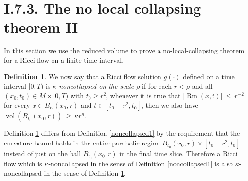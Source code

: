 \documentclass[12pt]{amsart}
\newcommand{\Rm}{\operatorname{Rm}}
\newcommand{\vol}{\operatorname{vol}}
\numberwithin{equation}{section}
\theoremstyle{plain}
\theoremstyle{definition}
\newtheorem{definition}[equation]{Definition}
\theoremstyle{remark}
\begin{document}
\section{I.7.3. The no local collapsing theorem II} \label{I.7.3}

In this section we use the reduced volume to prove a no-local-collapsing
theorem for a Ricci flow on a finite time interval.

\begin{definition} \label{noncollapsed2}
We now say that a Ricci flow solution $g(\cdot)$ defined on a time
interval $[0, T)$ is {\em $\kappa$-noncollapsed on the scale
$\rho$} if for each
$r < \rho$ and all $(x_0, t_0) \in M \times [0,T)$ 
with $t_0 \ge r^2$, 
whenever it is true that
$|\Rm(x,t)| \: \le \: r^{-2}$ for every $x \in B_{t_0}(x_0, r)$
and $t \in [t_0 - r^2, t_0]$, then we also have 
$\vol(B_{t_0}(x_0, r)) \: \ge \: \kappa r^n$.
\end{definition}

Definition \ref{noncollapsed2} differs from
Definition \ref{noncollapsed1} by the requirement that the
curvature bound holds in the entire parabolic region 
$B_{t_0}(x_0, r) \times [t_0 - r^2, t_0]$ instead of just on
the ball $B_{t_0}(x_0, r)$ in the final time slice.  Therefore a Ricci
flow which is $\kappa$-noncollapsed in the sense of 
Definition \ref{noncollapsed1} is also 
$\kappa$-noncollapsed in the sense of 
Definition \ref{noncollapsed2}.
\end{document}
